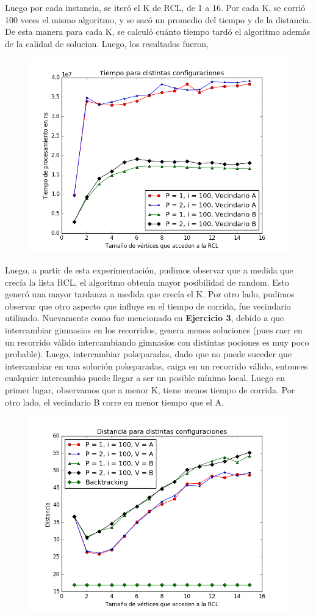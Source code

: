 Luego por cada instancia, se iteró el K de RCL, de 1 a 16. Por cada K, se corrió 100 veces el mismo algoritmo, y se sacó un promedio del tiempo y de la distancia. De esta manera para cada K, se calculó cuánto tiempo tardó el algoritmo además de la calidad de solucion. Luego, los resultados fueron, 


  \begin{figure}[H]
      \begin{center}
        \includegraphics[width=0.7\columnwidth]{imagenes/Exp1TIempoEJ4.png}
      \end{center}
  \end{figure}


  Luego, a partir de esta experimentación, pudimos observar que a medida que crecía la lista RCL, el algoritmo obtenía mayor posibilidad de random. Esto generó una mayor tardanza a medida que crecía el K. Por otro lado, pudimos observar que otro aspecto que influye en el tiempo de corrida, fue vecindario utilizado. Nuevamente como fue mencionado en \textbf{Ejercicio 3}, debido a que intercambiar gimnasios en los recorridos, genera menos soluciones (pues caer en un recorrido válido intercambiando gimnasios con distintas pociones es muy poco probable). Luego, intercambiar pokeparadas, dado que no puede suceder que intercambiar en una solución pokeparadas, caiga en un recorrido válido, entonces cualquier intercambio puede llegar a ser un posible mínimo local. Luego en primer lugar, observamos que a menor K, tiene menos tiempo de corrida. Por otro lado, el vecindario B corre en menor tiempo que el A.

\begin{figure}[H]
    \begin{center}
      \includegraphics[width=0.7\columnwidth]{imagenes/Exp1DistanciaEj4.png}
    \end{center}
\end{figure}

